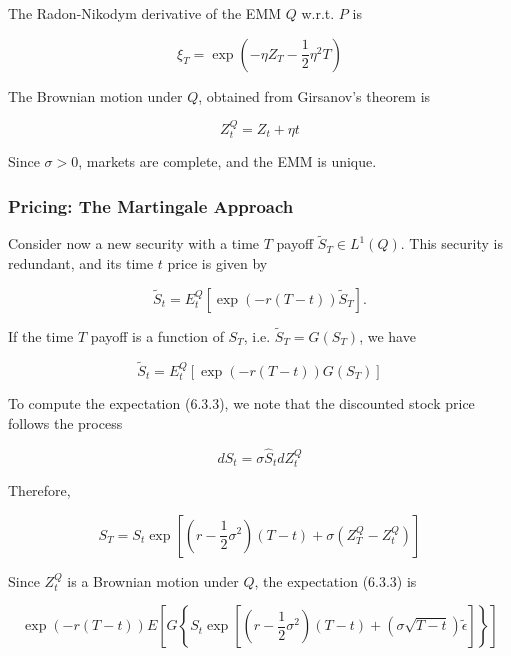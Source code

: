 \documentclass[\topdir/lecture\_notes.tex]{subfiles}
\begin{document}
The Radon-Nikodym derivative of the EMM \(Q\) w.r.t. \(P\) is

\begin{equation}
\xi_{T}=\exp \left(-\eta Z_{T}-\frac{1}{2} \eta^{2} T\right)
\end{equation}

The Brownian motion under \(Q\), obtained from Girsanov's theorem is

\begin{equation}
Z_{t}^{Q}=Z_{t}+\eta t
\end{equation}

Since \(\sigma>0\), markets are complete, and the EMM is unique.

\subsubsection{Pricing: The Martingale Approach}
Consider now a new security with a time \(T\) payoff \(\tilde{S}_{T} \in L^{1}(Q)\). This security is redundant, and its time \(t\) price is given by

\begin{equation}
\tilde{S}_{t}=E_{t}^{Q}\left[\exp (-r(T-t)) \tilde{S}_{T}\right] .
\end{equation}

If the time \(T\) payoff is a function of \(S_{T}\), i.e. \(\tilde{S}_{T}=G\left(S_{T}\right)\), we have

\begin{equation}
\tilde{S}_{t}=E_{t}^{Q}\left[\exp (-r(T-t)) G\left(S_{T}\right)\right] \label{eq:6.3.3}
\end{equation}

To compute the expectation (6.3.3), we note that the discounted stock price follows the process

\begin{equation}
d \hat{S}_{t}=\sigma \hat{S}_{t} d Z_{t}^{Q}
\end{equation}

Therefore,

\begin{equation*}
S_{T}=S_{t} \exp \left[\left(r-\frac{1}{2} \sigma^{2}\right)(T-t)+\sigma\left(Z_{T}^{Q}-Z_{t}^{Q}\right)\right]
\end{equation*}

Since \(Z_{t}^{Q}\) is a Brownian motion under \(Q\), the expectation (6.3.3) is

\begin{equation*}
\exp (-r(T-t)) E\left[G\left\{S_{t} \exp \left[\left(r-\frac{1}{2} \sigma^{2}\right)(T-t)+(\sigma \sqrt{T-t}) \tilde{\epsilon}\right]\right\}\right]
\end{equation*}
\end{document}
